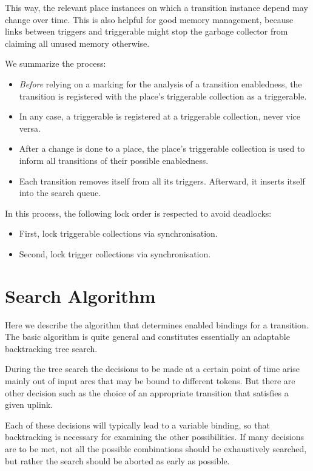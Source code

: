 This way, the relevant place instances on which a transition instance
depend may change over time. This is also helpful for good
memory management, because links between triggers and triggerable
might stop the garbage collector from claiming all unused
memory otherwise.

We summarize the process:
\begin{itemize}
\item \emph{Before} relying on a marking for the analysis
  of a transition enabledness, the transition is registered with
  the place's triggerable collection as a triggerable.
\item In any case, a triggerable is registered at a
  triggerable collection, never vice versa.
\item After a change is done to a place, the place's triggerable collection
  is used to inform all transitions of their possible enabledness.
\item Each transition removes itself from all its triggers.
  Afterward, it inserts itself into the search queue.
\end{itemize}

In this process, the following lock order is respected to avoid 
deadlocks:
\begin{itemize}
\item First, lock triggerable collections via synchronisation.
\item Second, lock trigger collections via synchronisation.
\end{itemize}

\section{Search Algorithm}

Here we describe the algorithm that determines enabled bindings for
a transition. The basic algorithm is quite general and constitutes
essentially an adaptable backtracking tree search.

During the tree search the decisions to be made at a certain point of time
arise mainly out of input arcs that may be bound to different tokens.
But there are other decision such as the choice of an appropriate
transition that satisfies a given uplink.

Each of these decisions will typically lead to a variable binding, 
so that backtracking is necessary for examining the other possibilities. 
If many decisions are to be met, not all the possible combinations 
should be exhaustively searched, but rather the search should be aborted 
as early as possible.

